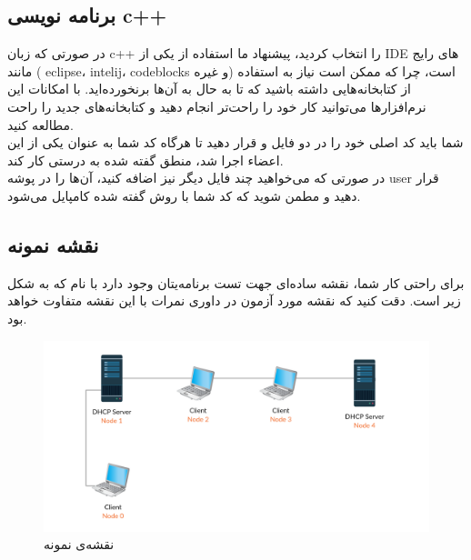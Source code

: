 \subsection{برنامه نویسی c++}
در صورتی که زبان c++ را انتخاب کردید، پیشنهاد ما استفاده از یکی از IDE های رایج مانند ( eclipse، intelij، codeblocks و غیره) است، چرا که ممکن است نیاز به استفاده از کتابخانه‌هایی داشته باشید که تا به حال به آن‌ها برنخورده‌اید. با امکانات این نرم‌افزار‌ها می‌توانید کار خود را راحت‌تر انجام دهید و کتابخانه‌های جدید را راحت مطالعه کنید. \\

شما باید کد اصلی خود را در دو فایل
و
قرار دهید تا هرگاه کد شما به عنوان یکی از این اعضاء اجرا شد، منطق گفته شده به درستی کار کند. \\

در صورتی‌ که می‌خواهید چند فایل دیگر نیز اضافه کنید، آن‌ها را در پوشه user قرار دهید و مطمن شوید که کد شما با روش گفته شده کامپایل می‌شود.
\subsection{نقشه نمونه}
برای راحتی کار شما، نقشه ساده‌ای جهت تست برنامه‌یتان وجود دارد با نام
که به شکل زیر است. دقت کنید که نقشه مورد آزمون در داوری نمرات با این نقشه متفاوت خواهد بود. \begin{figure}[h!]
	\begin{center}
 		\caption{نقشه‌ی نمونه}
		\includegraphics[scale=.4]{DHCP_Simple.png}
	\end{center}
\end{figure}
